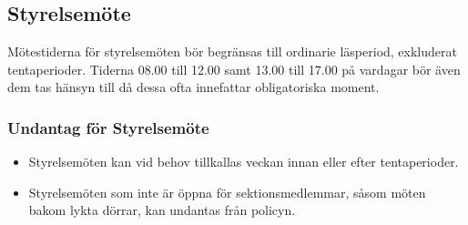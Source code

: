 \documentclass[]{dsekprotokoll}
\begin{document}
\subsection{Styrelsemöte}
Mötestiderna för styrelsemöten bör begränsas till ordinarie läsperiod, exkluderat tentaperioder. Tiderna 08.00 till 12.00 samt 13.00 till 17.00 på vardagar bör även dem tas hänsyn till då dessa ofta innefattar obligatoriska moment.

\subsubsection{Undantag för Styrelsemöte}
\begin{itemize}
    \item Styrelsemöten kan vid behov tillkallas veckan innan eller efter tentaperioder.
    \item Styrelsemöten som inte är öppna för sektionsmedlemmar, såsom möten bakom lykta dörrar, kan undantas från policyn.
\end{itemize}
\end{document}
